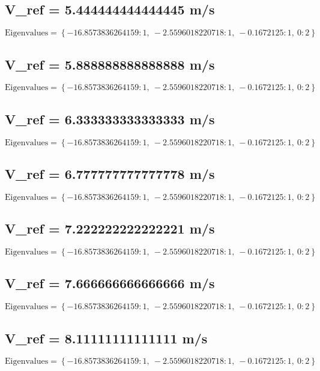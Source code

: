 \documentclass{article}
\begin{document}
\subsection*{V_ref = 5.444444444444445 m/s}
\begin{equation}
\text{Eigenvalues} = \left\{ -16.8573836264159 : 1, \  -2.5596018220718 : 1, \  -0.1672125 : 1, \  0 : 2\right\}
\end{equation}
\subsection*{V_ref = 5.888888888888888 m/s}
\begin{equation}
\text{Eigenvalues} = \left\{ -16.8573836264159 : 1, \  -2.5596018220718 : 1, \  -0.1672125 : 1, \  0 : 2\right\}
\end{equation}
\subsection*{V_ref = 6.333333333333333 m/s}
\begin{equation}
\text{Eigenvalues} = \left\{ -16.8573836264159 : 1, \  -2.5596018220718 : 1, \  -0.1672125 : 1, \  0 : 2\right\}
\end{equation}
\subsection*{V_ref = 6.777777777777778 m/s}
\begin{equation}
\text{Eigenvalues} = \left\{ -16.8573836264159 : 1, \  -2.5596018220718 : 1, \  -0.1672125 : 1, \  0 : 2\right\}
\end{equation}
\subsection*{V_ref = 7.222222222222221 m/s}
\begin{equation}
\text{Eigenvalues} = \left\{ -16.8573836264159 : 1, \  -2.5596018220718 : 1, \  -0.1672125 : 1, \  0 : 2\right\}
\end{equation}
\subsection*{V_ref = 7.666666666666666 m/s}
\begin{equation}
\text{Eigenvalues} = \left\{ -16.8573836264159 : 1, \  -2.5596018220718 : 1, \  -0.1672125 : 1, \  0 : 2\right\}
\end{equation}
\subsection*{V_ref = 8.11111111111111 m/s}
\begin{equation}
\text{Eigenvalues} = \left\{ -16.8573836264159 : 1, \  -2.5596018220718 : 1, \  -0.1672125 : 1, \  0 : 2\right\}
\end{equation}
\end{document}
